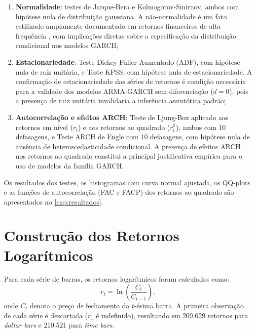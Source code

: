 \begin{enumerate}
    \item \textbf{Normalidade}: testes de Jarque-Bera e
          Kolmogorov-Smirnov, ambos com hipótese nula de distribuição
          gaussiana. A não-normalidade é um fato estilizado amplamente
          documentado em retornos financeiros de alta frequência
          \cite{tsay2010}, com implicações diretas sobre a especificação
          da distribuição condicional nos modelos GARCH;
    \item \textbf{Estacionariedade}: Teste Dickey-Fuller Aumentado
          (ADF), com hipótese nula de raiz unitária, e Teste KPSS, com
          hipótese nula de estacionariedade. A confirmação de
          estacionariedade das séries de retornos é condição necessária
          para a validade dos modelos ARMA-GARCH sem diferenciação
          ($d = 0$), pois a presença de raiz unitária invalidaria a
          inferência assintótica padrão;
    \item \textbf{Autocorrelação e efeitos ARCH}: Teste de Ljung-Box
          aplicado aos retornos em nível ($r_t$) e aos retornos ao
          quadrado ($r_t^2$), ambos com 10 defasagens, e Teste ARCH de
          Engle com 10 defasagens, com hipótese nula de ausência de
          heteroscedasticidade condicional. A presença de efeitos ARCH
          nos retornos ao quadrado constitui a principal justificativa
          empírica para o uso de modelos da família GARCH.
\end{enumerate}

Os resultados dos testes, os histogramas com curva normal ajustada, os
QQ-plots e as funções de autocorrelação (FAC e FACP) dos retornos ao
quadrado são apresentados no \autoref{cap:resultados}.

\section{Construção dos Retornos Logarítmicos}
\label{sec:met_retornos}

Para cada série de barras, os retornos logarítmicos foram calculados como:
%
\begin{equation}
    \label{eq:met_log_return}
    r_t = \ln\left(\frac{C_t}{C_{t-1}}\right),
\end{equation}
%
onde $C_t$ denota o preço de fechamento da $t$-ésima barra. A primeira
observação de cada série é descartada ($r_1$ é indefinido), resultando em
209.629 retornos para \emph{dollar bars} e 210.521 para \emph{time bars}.

